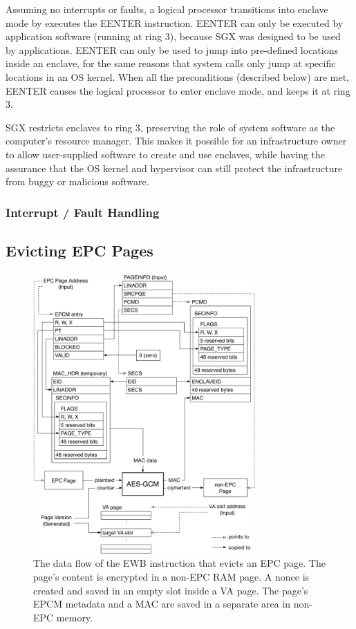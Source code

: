 Assuming no interrupts or faults, a logical processor transitions into enclave
mode by executes the EENTER instruction. EENTER can only be executed by
application software (running at ring 3), because SGX was designed to be used
by applications. EENTER can only be used to jump into pre-defined locations
inside an enclave, for the same reasons that system calls only jump at specific
locations in an OS kernel. When all the preconditions (described below) are
met, EENTER causes the logical processor to enter enclave mode, and keeps it at
ring 3.

SGX restricts enclaves to ring 3, preserving the role of system software as
the computer's resource manager. This makes it possible for an infrastructure
owner to allow user-supplied software to create and use enclaves, while having
the assurance that the OS kernel and hypervisor can still protect the
infrastructure from buggy or malicious software.


\subsubsection{Interrupt / Fault Handling}
\label{sec:aex}





\subsection{Evicting EPC Pages}
\label{sec:sgx_ewb}



\begin{figure}[hbt!]
  \centering
  \includegraphics[width=85mm]{figures/sgx_ewb.pdf}
  \caption{
    The data flow of the EWB instruction that evicts an EPC page. The page's
    content is encrypted in a non-EPC RAM page. A nonce is created and saved
    in an empty slot inside a VA page. The page's EPCM metadata and a MAC
    are saved in a separate area in non-EPC memory.
  }
  \label{fig:sgx_ewb}
\end{figure}



